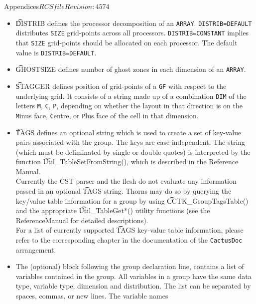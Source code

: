 \begin{cactuspart}{Appendices}{$RCSfile$}{$Revision: 4574 $}
\begin{itemize}
        This should be a comma-separated list of valid arithmetical
        expressions consisting of integers or integer-valued parameters.
\item{} {\t DISTRIB} defines the processor decomposition of an {\tt ARRAY}.
        {\tt DISTRIB=DEFAULT} distributes {\tt SIZE} grid-points
        across all processors. {\tt DISTRIB=CONSTANT} implies that
        {\tt SIZE} grid-points should be allocated on each
        processor. The default value is {\tt DISTRIB=DEFAULT}.
\item{} {\t GHOSTSIZE} defines number of ghost zones in each dimension
of an {\tt ARRAY}.  
\item{} {\t STAGGER} defines position of grid-points of a {\tt GF} with respect to
        the underlying grid.  It consists of a string made up of a combination {\tt DIM}
        of the letters {\tt M}, {\tt C}, {\tt P}, depending on whether the layout in
        that direction is on the {\tt M}inus face, {\tt C}entre, or {\tt P}lus face
        of the cell in that dimension.
\item{} {\t TAGS} defines an optional string which is used to create a
	set of key-value pairs associated with the group. The keys are case
	independent.  The string (which must be deliminated by single or
	double quotes) is interpreted by the function
	{\t Util\_TableSetFromString()}, which is described in the
        Reference Manual.\\
        Currently the CST parser and the flesh do not evaluate any information
        passed in an optional {\t TAGS} string. Thorns may do so by
        querying the key/value table information for a group by using
        {\t CCTK\_GroupTagsTable()} and the
        appropriate {\t Util\_TableGet*()} utility functions
        (see the ReferenceManual for detailed descriptions).\\
        For a list of currently supported {\t TAGS} key-value table information,
        please refer to the corresponding chapter in the documentation of the
        \verb|CactusDoc| arrangement.%
\item{} The (optional) block following the group declaration line,
contains a list of variables contained in the group. All variables in
a group have the same data type, variable type, dimension and
distribution. The list
can be separated by spaces, commas, or new lines. The variable names

\end{itemize}
\end{cactuspart}
